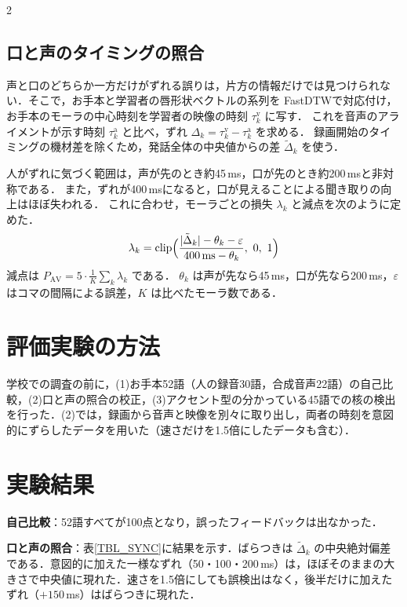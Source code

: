 \begin{multicols*}{2}
\subsection{口と声のタイミングの照合}
声と口のどちらか一方だけがずれる誤りは，片方の情報だけでは見つけられない．そこで，お手本と学習者の唇形状ベクトルの系列を FastDTW\cite{salvador2007}で対応付け，お手本のモーラの中心時刻を学習者の映像の時刻 $\tau^{\mathrm{v}}_k$ に写す．
これを音声のアライメントが示す時刻 $\tau^{\mathrm{a}}_k$ と比べ，ずれ $\Delta_k = \tau^{\mathrm{v}}_k - \tau^{\mathrm{a}}_k$ を求める．
録画開始のタイミングの機材差を除くため，発話全体の中央値からの差 $\tilde{\Delta}_k$ を使う．

人がずれに気づく範囲は，声が先のとき約45\,ms，口が先のとき約200\,msと非対称である\cite{grant2003}．
また，ずれが400\,msになると，口が見えることによる聞き取りの向上はほぼ失われる\cite{grant2001}．
これに合わせ，モーラごとの損失 $\lambda_k$ と減点を次のように定めた．
\begin{equation}
\lambda_k = \mathrm{clip}\Bigl(\frac{\lvert \tilde{\Delta}_k \rvert - \theta_k - \varepsilon}{400\,\mathrm{ms} - \theta_k},\ 0,\ 1\Bigr)
\end{equation}
減点は $P_{\mathrm{AV}} = 5 \cdot \frac{1}{K}\sum_k \lambda_k$ である．
$\theta_k$ は声が先なら45\,ms，口が先なら200\,ms，$\varepsilon$ はコマの間隔による誤差，$K$ は比べたモーラ数である．

\section{評価実験の方法}
学校での調査の前に，(1)お手本52語（人の録音30語，合成音声22語）の自己比較，(2)口と声の照合の校正，(3)アクセント型の分かっている45語での核の検出を行った．(2)では，録画から音声と映像を別々に取り出し，両者の時刻を意図的にずらしたデータを用いた（速さだけを1.5倍にしたデータも含む）．

\section{実験結果}
\textbf{自己比較}：52語すべてが100点となり，誤ったフィードバックは出なかった．

\textbf{口と声の照合}：表\ref{TBL_SYNC}に結果を示す．ばらつきは $\tilde{\Delta}_k$ の中央絶対偏差である．意図的に加えた一様なずれ（50・100・200\,ms）は，ほぼそのままの大きさで中央値に現れた．速さを1.5倍にしても誤検出はなく，後半だけに加えたずれ（$+150$\,ms）はばらつきに現れた．


\end{multicols*}
